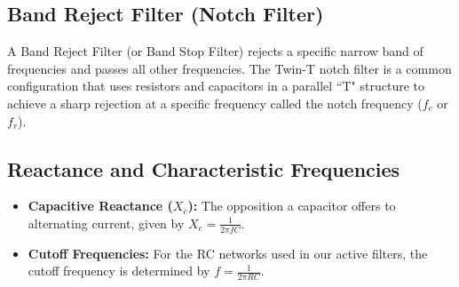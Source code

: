 \documentclass[12pt,a4paper]{article}
\begin{document}
\subsection{Band Reject Filter (Notch Filter)}
A Band Reject Filter (or Band Stop Filter) rejects a specific narrow band of frequencies and passes all other frequencies. The Twin-T notch filter is a common configuration that uses resistors and capacitors in a parallel ``T" structure to achieve a sharp rejection at a specific frequency called the notch frequency ($f_c$ or $f_r$).

\subsection{Reactance and Characteristic Frequencies}
\begin{itemize}
    \item \textbf{Capacitive Reactance ($X_c$):} The opposition a capacitor offers to alternating current, given by $X_c = \frac{1}{2\pi f C}$.
    \item \textbf{Cutoff Frequencies:} For the RC networks used in our active filters, the cutoff frequency is determined by $f = \frac{1}{2\pi R C}$.
\end{itemize}
\end{document}
